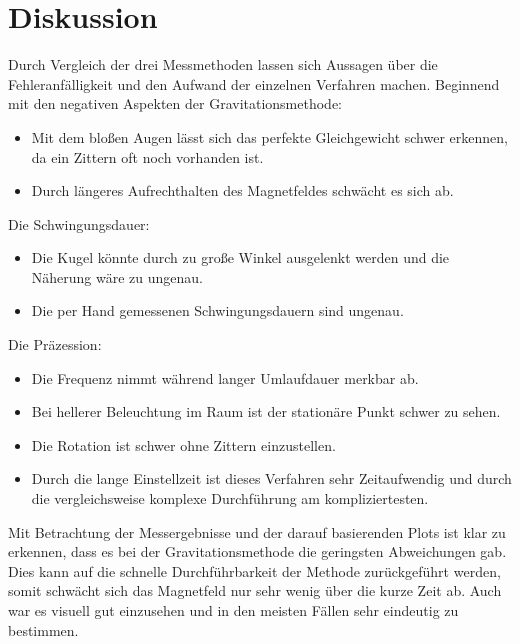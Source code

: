 \section{Diskussion}
\label{sec:Diskussion}
Durch Vergleich der drei Messmethoden lassen sich Aussagen über die Fehleranfälligkeit und den Aufwand der einzelnen Verfahren machen.
Beginnend mit den negativen Aspekten der Gravitationsmethode:
\begin{itemize}
    \item Mit dem bloßen Augen lässt sich das perfekte Gleichgewicht schwer erkennen, da ein Zittern oft noch vorhanden ist.
    \item Durch längeres Aufrechthalten des Magnetfeldes schwächt es sich ab.
\end{itemize}
Die Schwingungsdauer:
\begin{itemize}
    \item Die Kugel könnte durch zu große Winkel ausgelenkt werden und die Näherung wäre zu ungenau.
    \item Die per Hand gemessenen Schwingungsdauern sind ungenau.
\end{itemize}
Die Präzession:
\begin{itemize}
    \item Die Frequenz nimmt während langer Umlaufdauer merkbar ab.
    \item Bei hellerer Beleuchtung im Raum ist der stationäre Punkt schwer zu sehen.
    \item Die Rotation ist schwer ohne Zittern einzustellen.
    \item Durch die lange Einstellzeit ist dieses Verfahren sehr Zeitaufwendig und durch die vergleichsweise komplexe Durchführung am kompliziertesten.
\end{itemize}

Mit Betrachtung der Messergebnisse und der darauf basierenden Plots ist klar zu erkennen, dass es bei der Gravitationsmethode die geringsten Abweichungen gab.
Dies kann auf die schnelle Durchführbarkeit der Methode zurückgeführt werden, somit schwächt sich das Magnetfeld nur sehr wenig über die kurze Zeit ab.
Auch war es visuell gut einzusehen und in den meisten Fällen sehr eindeutig zu bestimmen.
